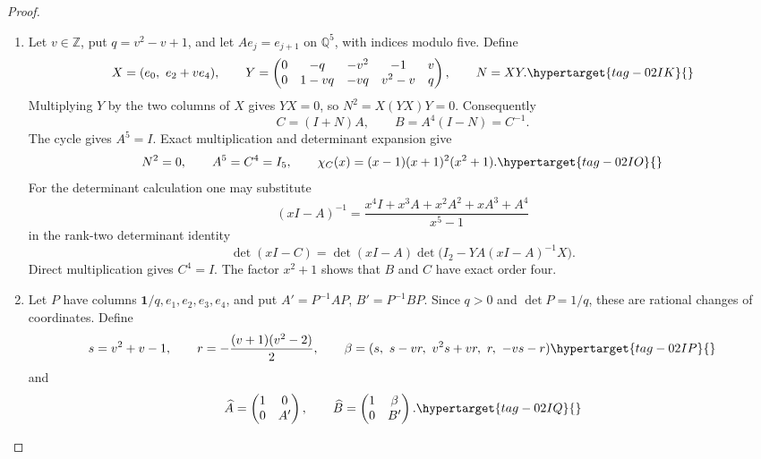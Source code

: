 \documentclass[11pt,a4paper]{article}
\numberwithin{equation}{section}
\theoremstyle{definition}
\begin{document}
\begin{proof}
\begin{enumerate}[label=\arabic*.]
\item Let $v\in\mathbb Z$, put $q=v^2-v+1$, and let
$Ae_j=e_{j+1}$ on $\mathbb Q^5$, with indices modulo five. Define
\begin{equation}
 X=(e_0,\ e_2+ve_4),\qquad
 Y=\begin{pmatrix}
 0&-q&-v^2&-1&v\\
 0&1-vq&-vq&v^2-v&q
 \end{pmatrix},\qquad N=XY.
 \hypertarget{tag-02IK}{}\label{maps:eq:F.U1}
\end{equation}
Multiplying $Y$ by the two columns of $X$ gives $YX=0$, so
$N^2=X(YX)Y=0$. Consequently
\[
 C=(I+N)A,\qquad B=A^4(I-N)=C^{-1}.
\]
The cycle gives $A^5=I$. Exact multiplication and determinant
expansion give
\begin{equation}
 N^2=0,\qquad A^5=C^4=I_5,\qquad
 \chi_C(x)=(x-1)(x+1)^2(x^2+1).
 \hypertarget{tag-02IO}{}\label{maps:eq:F.U2}
\end{equation}
For the determinant calculation one may substitute
\[
 (xI-A)^{-1}=
 \frac{x^4I+x^3A+x^2A^2+xA^3+A^4}{x^5-1}
\]
in the rank-two determinant identity
\[
 \det(xI-C)=\det(xI-A)
       \det\bigl(I_2-YA(xI-A)^{-1}X\bigr).
\]
Direct multiplication gives $C^4=I$.
The factor $x^2+1$ shows that $B$ and $C$ have exact order four.

\item Let $P$ have columns $\mathbf1/q,e_1,e_2,e_3,e_4$, and put
$A'=P^{-1}AP$, $B'=P^{-1}BP$. Since $q>0$ and $\det P=1/q$,
these are rational changes of coordinates. Define
\begin{equation}
 s=v^2+v-1,\qquad r=-\frac{(v+1)(v^2-2)}2,
 \qquad
 \beta=(s,\ s-vr,\ v^2s+vr,\ r,\ -vs-r)
 \hypertarget{tag-02IP}{}\label{maps:eq:F.U3}
\end{equation}
and
\begin{equation}
 \widehat A=\begin{pmatrix}1&0\\0&A'\end{pmatrix},\qquad
 \widehat B=\begin{pmatrix}1&\beta\\0&B'\end{pmatrix}.
 \hypertarget{tag-02IQ}{}\label{maps:eq:F.U4}
\end{equation}


\end{enumerate}
\end{proof}
\end{document}
